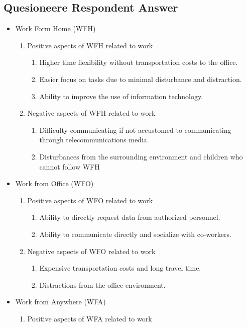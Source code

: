 \documentclass[conference]{IEEEtran}
\begin{document}
\subsection{Quesioneere Respondent Answer}
\begin{itemize}
\item {Work Form Home (WFH)}
\begin{enumerate}
\item{Positive aspects of WFH related to work}
\begin{enumerate}
\item Higher time flexibility without transportation costs to the office.
\item Easier focus on tasks due to minimal disturbance and distraction.
\item Ability to improve the use of information technology.
\end{enumerate}
\item{Negative aspects of WFH related to work}
\begin{enumerate}
\item Difficulty communicating if not accustomed to communicating through telecommunications media.
\item Disturbances from the surrounding environment and children who cannot follow WFH
\end{enumerate}
\end{enumerate}
\item {Work from Office (WFO)}
\begin{enumerate}
\item {Positive aspects of WFO related to work}
\begin{enumerate}
\item Ability to directly request data from authorized personnel.
\item Ability to communicate directly and socialize with co-workers.
\end{enumerate}
\item {Negative aspects of WFO related to work}
\begin{enumerate}
\item Expensive transportation costs and long travel time.
\item Distractions from the office environment.
\end{enumerate}
\end{enumerate}
\item {Work from Anywhere (WFA)}
\begin{enumerate}
\item {Positive aspects of WFA related to work}

\end{enumerate}
\end{itemize}
\end{document}
